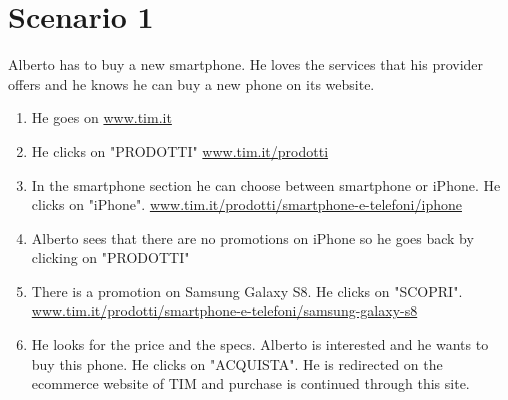 \section{Scenario 1}
Alberto has to buy a new smartphone. He loves the services that his provider offers and he knows he can buy a new phone on its website.

\begin{enumerate}
	\item He goes on \url{www.tim.it}
	\item He clicks on "PRODOTTI" \url{www.tim.it/prodotti}
	\item In the smartphone section he can choose between smartphone or iPhone. He clicks on "iPhone". \url{www.tim.it/prodotti/smartphone-e-telefoni/iphone}
	\item Alberto sees that there are no promotions on iPhone so he goes back by clicking on "PRODOTTI"
	\item There is a promotion on Samsung Galaxy S8. He clicks on "SCOPRI". \url{www.tim.it/prodotti/smartphone-e-telefoni/samsung-galaxy-s8}
	\item He looks for the price and the specs. Alberto is interested and he wants to buy this phone. He clicks on "ACQUISTA". He is redirected on the ecommerce website of TIM and purchase is continued through this site.
\end{enumerate}

